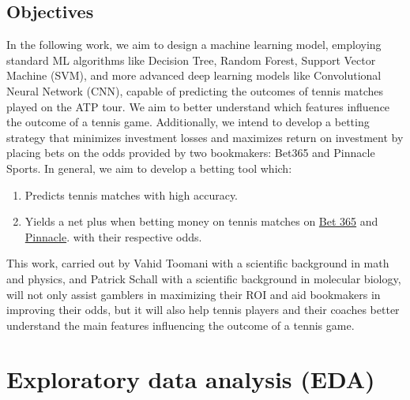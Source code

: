 \documentclass[preprint,aps,nofootinbib,a4paper,superscriptaddress,longbibliography,amsfonts,amssymb,amsmath,titlepage]{revtex4-2}
\begin{document}
\subsection{Objectives}

In the following work, we aim to design a machine learning model, employing standard ML algorithms like Decision Tree, Random Forest, Support Vector Machine (SVM), and more advanced deep learning models like Convolutional Neural Network (CNN), capable of predicting the outcomes of tennis matches played on the ATP tour. We aim to better understand which features influence the outcome of a tennis game. Additionally, we intend to develop a betting strategy that minimizes investment losses and maximizes return on investment by placing bets on the odds provided by two bookmakers: Bet365 and Pinnacle Sports. In general, we aim to develop a betting tool which:
%
\begin{enumerate}
\item Predicts tennis matches with high accuracy.
\item Yields a net plus when betting money on tennis matches on \href{https://bet365.com/}{Bet 365} and \href{https://pinnacle.com/}{Pinnacle}.
with their respective odds.
\end{enumerate}
%
This work, carried out by Vahid Toomani with a scientific background in math and physics, and Patrick Schall with a scientific background in molecular biology, will not only assist gamblers in maximizing their ROI and aid bookmakers in improving their odds, but it will also help tennis players and their coaches better understand the main features influencing the outcome of a tennis game.


\section{Exploratory data analysis (EDA)}
\end{document}
